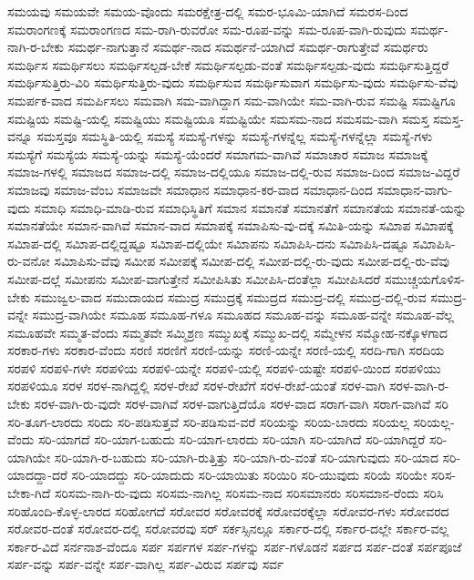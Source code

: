 {ಸಮಯವು
ಸಮಯವೇ
ಸಮಯ-ವೊಂದು
ಸಮರಕ್ಷೇತ್ರ-ದಲ್ಲಿ
ಸಮರ-ಭೂಮಿ-ಯಾಗಿದೆ
ಸಮರಸ-ದಿಂದ
ಸಮರಾಂಗಣಕ್ಕೆ
ಸಮರಾಂಗಣದ
ಸಮ-ರಾಗಿ-ರುವರೋ
ಸಮ-ರೂಪ-ವನ್ನು
ಸಮ-ರೂಪ-ವಾಗಿ-ರುವುದು
ಸಮರ್ಥ-ನಾಗಿ-ರ-ಬೇಕು
ಸಮರ್ಥ-ನಾಗುತ್ತಾನೆ
ಸಮರ್ಥ-ನಾದ
ಸಮರ್ಥನೆ-ಯಾಗಿದೆ
ಸಮರ್ಥ-ರಾಗುತ್ತೇವೆ
ಸಮರ್ಥರು
ಸಮರ್ಥಿಸ
ಸಮರ್ಥಿಸಲು
ಸಮರ್ಥಿಸಲ್ಪಡ-ಬೇಕೆ
ಸಮರ್ಥಿಸಲ್ಪಡು-ವಂತೆ
ಸಮರ್ಥಿಸಲ್ಪಡು-ವುದು
ಸಮರ್ಥಿಸುತ್ತಿದ್ದರೆ
ಸಮರ್ಥಿಸುತ್ತಿರು-ವಿರಿ
ಸಮರ್ಥಿಸುತ್ತಿರು-ವುದು
ಸಮರ್ಥಿಸುವ
ಸಮರ್ಥಿಸುವಾಗ
ಸಮರ್ಥಿಸು-ವುದು
ಸಮರ್ಥಿಸು-ವೆವು
ಸಮರ್ಪಕ-ವಾದ
ಸಮರ್ಪಿಸಲು
ಸಮವಾಗಿ
ಸಮ-ವಾಗಿದ್ದಾಗ
ಸಮ-ವಾಗಿಯೇ
ಸಮ-ವಾಗಿ-ರುವ
ಸಮಷ್ಟಿ
ಸಮಷ್ಟಿಗೂ
ಸಮಷ್ಟಿಯ
ಸಮಷ್ಟಿ-ಯಲ್ಲಿ
ಸಮಷ್ಟಿಯು
ಸಮಷ್ಟಿಯೂ
ಸಮಷ್ಟಿಯೇ
ಸಮಸಮ-ನಾದ
ಸಮಸಮ-ವಾಗಿ
ಸಮಸ್ತ
ಸಮಸ್ತ-ವನ್ನೂ
ಸಮಸ್ತವೂ
ಸಮಸ್ಥಿತಿ-ಯಲ್ಲಿ
ಸಮಸ್ಯೆ
ಸಮಸ್ಯೆ-ಗಳನ್ನು
ಸಮಸ್ಯೆ-ಗಳನ್ನೆಲ್ಲ
ಸಮಸ್ಯೆ-ಗಳನ್ನೆಲ್ಲಾ
ಸಮಸ್ಯೆ-ಗಳು
ಸಮಸ್ಯೆಗೆ
ಸಮಸ್ಯೆಯ
ಸಮಸ್ಯೆ-ಯನ್ನು
ಸಮಸ್ಯೆ-ಯೆಂದರೆ
ಸಮಾಗಮ-ವಾಗಿವೆ
ಸಮಾಚಾರ
ಸಮಾಜ
ಸಮಾಜಕ್ಕೆ
ಸಮಾಜ-ಗಳಲ್ಲಿ
ಸಮಾಜದ
ಸಮಾಜ-ದಲ್ಲಿ
ಸಮಾಜ-ದಲ್ಲಿಯೂ
ಸಮಾಜ-ದಲ್ಲಿ-ರುವ
ಸಮಾಜ-ದಿಂದ
ಸಮಾಜ-ವಿದ್ದರೆ
ಸಮಾಜವು
ಸಮಾಜ-ವೆಂಬ
ಸಮಾಜವೇ
ಸಮಾಧಾನ
ಸಮಾಧಾನ-ಕರ-ವಾದ
ಸಮಾಧಾನ-ದಿಂದ
ಸಮಾಧಾನ-ವಾಗು-ವುದು
ಸಮಾಧಿ
ಸಮಾಧಿ-ಮಾಡಿ-ರುವ
ಸಮಾಧಿಸ್ಥಿತಿಗೆ
ಸಮಾನ
ಸಮಾನತೆ
ಸಮಾನತೆಗೆ
ಸಮಾನತೆಯ
ಸಮಾನತೆ-ಯನ್ನು
ಸಮಾನತೆಯೇ
ಸಮಾನ-ವಾಗಿವೆ
ಸಮಾನ-ವಾದ
ಸಮಾಪಕ್ಕೆ
ಸಮಾಪಿಸು-ವು-ದಕ್ಕೆ
ಸಮಿತಿ-ಯನ್ನು
ಸಮಿಾಪ
ಸಮಿಾಪಕ್ಕೆ
ಸಮಿಾಪ-ದಲ್ಲಿ
ಸಮಿಾಪ-ದಲ್ಲಿದ್ದಷ್ಟೂ
ಸಮಿಾಪ-ದಲ್ಲಿಯೇ
ಸಮಿಾಪನು
ಸಮಿಾಪಿಸಿ-ದನು
ಸಮಿಾಪಿಸಿ-ದಷ್ಟೂ
ಸಮಿಾಪಿಸಿ-ರು-ವನೋ
ಸಮಿಾಪಿಸು-ವೆವು
ಸಮೀಪ
ಸಮೀಪಕ್ಕೆ
ಸಮೀಪ-ದಲ್ಲಿ
ಸಮೀಪ-ದಲ್ಲಿ-ರು-ವುದು
ಸಮೀಪ-ದಲ್ಲಿ-ರು-ವೆವು
ಸಮೀಪ-ದಲ್ಲೆ
ಸಮೀಪನು
ಸಮೀಪ-ವಾಗುತ್ತೇನೆ
ಸಮೀಪಿಸಿತು
ಸಮೀಪಿಸಿ-ದಂತೆಲ್ಲಾ
ಸಮೀಪಿಸಿದರೆ
ಸಮುಚ್ಚಯಗೊಳಿಸ-ಬೇಕು
ಸಮುಜ್ವಲ-ವಾದ
ಸಮುದಾಯದ
ಸಮುದ್ರ
ಸಮುದ್ರಕ್ಕೆ
ಸಮುದ್ರದ
ಸಮುದ್ರ-ದಲ್ಲಿ
ಸಮುದ್ರ-ದಲ್ಲಿ-ರುವ
ಸಮುದ್ರ-ವನ್ನೇ
ಸಮುದ್ರ-ವಾಗಿಯೇ
ಸಮೂಹ
ಸಮೂಹ-ಗಳೂ
ಸಮೂಹದ
ಸಮೂಹ-ವನ್ನು
ಸಮೂಹ-ವನ್ನೇ
ಸಮೂಹ-ವೆಲ್ಲ
ಸಮೂಹವೇ
ಸಮ್ಮತ-ವೆಂದು
ಸಮ್ಮತವೇ
ಸಮ್ಮಿಶ್ರಣ
ಸಮ್ಮುಖಕ್ಕೆ
ಸಮ್ಮುಖ-ದಲ್ಲಿ
ಸಮ್ಮೇಳನ
ಸಮ್ಮೋಹ-ನಕ್ಕೊಳಗಾದ
ಸರಕಾರ-ಗಳು
ಸರಕಾರ-ವೆಂದು
ಸರಣಿ
ಸರಣಿಗೆ
ಸರಣಿ-ಯನ್ನು
ಸರಣಿ-ಯನ್ನೇ
ಸರಣಿ-ಯಲ್ಲಿ
ಸರದಿ-ಗಾಗಿ
ಸರದಿಯ
ಸರಪಳಿ
ಸರಪಳಿ-ಗಳೇ
ಸರಪಳಿಯ
ಸರಪಳಿ-ಯನ್ನೇ
ಸರಪಳಿ-ಯಲ್ಲಿ
ಸರಪಳಿ-ಯಷ್ಟೇ
ಸರಪಳಿ-ಯಿಂದ
ಸರಪಳಿಯು
ಸರಪಳಿಯೂ
ಸರಳ
ಸರಳ-ನಾಗಿದ್ದಲ್ಲಿ
ಸರಳ-ರೇಖೆ
ಸರಳ-ರೇಖೆಗೆ
ಸರಳ-ರೇಖೆ-ಯಂತೆ
ಸರಳ-ವಾಗಿ
ಸರಳ-ವಾಗಿ-ರ-ಬೇಕು
ಸರಳ-ವಾಗಿ-ರು-ವುದೇ
ಸರಳ-ವಾಗಿವೆ
ಸರಳ-ವಾಗುತ್ತಿದೆಯೊ
ಸರಳ-ವಾದ
ಸರಾಗ-ವಾಗಿ
ಸರಾಗ-ವಾಗಿವೆ
ಸರಿ
ಸರಿ-ತೂಗ-ಲಾರದು
ಸರಿದು
ಸರಿ-ಪಡಿಸುತ್ತವೆ
ಸರಿ-ಪಡಿಸುವ-ವರೆ
ಸರಿಯನ್ನು
ಸರಿಯ-ಬಾರದು
ಸರಿಯಲ್ಲ
ಸರಿಯಲ್ಲ-ವೆಂದು
ಸರಿ-ಯಾಗದೆ
ಸರಿ-ಯಾಗ-ಬಹುದು
ಸರಿ-ಯಾಗ-ಲಾರದು
ಸರಿ-ಯಾಗಿ
ಸರಿ-ಯಾಗಿದೆ
ಸರಿ-ಯಾಗಿದ್ದರೆ
ಸರಿ-ಯಾಗಿಯೇ
ಸರಿ-ಯಾಗಿ-ರ-ಬಹುದು
ಸರಿ-ಯಾಗಿ-ರುತ್ತಿತ್ತು
ಸರಿ-ಯಾಗಿ-ರು-ವಂತೆ
ಸರಿ-ಯಾಗುವುದು
ಸರಿ-ಯಾದ
ಸರಿ-ಯಾದದ್ದಾ-ದರೆ
ಸರಿ-ಯಾದದ್ದು
ಸರಿ-ಯಾದುದು
ಸರಿ-ಯಾಯಿತು
ಸರಿಯಿರಿ
ಸರಿ-ಯುವುದು
ಸರಿಯೆ
ಸರಿಯೇ
ಸರಿಸ-ಬೇಕಾ-ಗಿದೆ
ಸರಿಸಮ-ನಾಗಿ-ರು-ವುದು
ಸರಿಸಮ-ನಾಗಿಲ್ಲ
ಸರಿಸಮ-ನಾದ
ಸರಿಸಮಾನರು
ಸರಿಸಮಾನ-ರೆಂದು
ಸರಿಸಿ
ಸರಿಹೊಂದಿ-ಕೊಳ್ಳ-ಲಾರದ
ಸರಿಹೋಗದೆ
ಸರೋವರ
ಸರೋವರಕ್ಕೆ
ಸರೋವರಕ್ಕೆಲ್ಲಾ
ಸರೋವರ-ಗಳು
ಸರೋವರದ
ಸರೋವರ-ದಂತೆ
ಸರೋವರ-ದಲ್ಲಿ
ಸರೋವರವು
ಸರ್
ಸರ್ಕಸ್ಸಿನಲ್ಲೂ
ಸರ್ಕಾರ-ದಲ್ಲಿ
ಸರ್ಕಾರ-ದಲ್ಲೇ
ಸರ್ಕಾರ-ವಲ್ಲ
ಸರ್ಕಾರ-ವಿದೆ
ಸರ್ನನಾಶ-ವೆಂದೂ
ಸರ್ಪ
ಸರ್ಪಗಳ
ಸರ್ಪ-ಗಳನ್ನು
ಸರ್ಪ-ಗಳೊಡನೆ
ಸರ್ಪದ
ಸರ್ಪ-ದಂತೆ
ಸರ್ಪಪೂಜೆ
ಸರ್ಪ-ವನ್ನು
ಸರ್ಪ-ವನ್ನೇ
ಸರ್ಪ-ವಾಗಿಲ್ಲ
ಸರ್ಪ-ವಿರುವ
ಸರ್ಪವು
ಸರ್ವ
}
